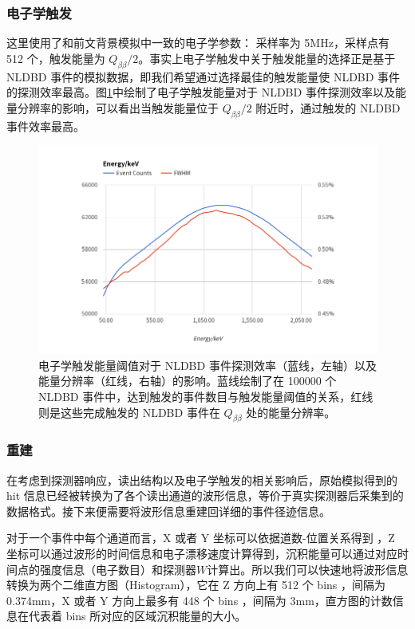 \subsubsection{电子学触发}

    这里使用了和前文背景模拟中一致的电子学参数： 采样率为 5MHz，采样点有 512 个，触发能量为 $Q_{\beta\beta}/2$。事实上电子学触发中关于触发能量的选择正是基于 NLDBD 事件的模拟数据，即我们希望通过选择最佳的触发能量使 NLDBD 事件的探测效率最高。图\ref{fig:trigger_select}中绘制了电子学触发能量对于 NLDBD 事件探测效率以及能量分辨率的影响，可以看出当触发能量位于 $Q_{\beta\beta}/2$ 附近时，通过触发的 NLDBD 事件效率最高。

    \begin{figure}
        \centering
        \includegraphics[width=0.8\columnwidth]{pic/trigger_select.png}
        \caption{电子学触发能量阈值对于 NLDBD 事件探测效率（蓝线，左轴）以及能量分辨率（红线，右轴）的影响。蓝线绘制了在 100000 个 NLDBD 事件中，达到触发的事件数目与触发能量阈值的关系，红线则是这些完成触发的 NLDBD 事件在 $Q_{\beta\beta}$ 处的能量分辨率。}
        \label{fig:trigger_select}
    \end{figure}

\subsubsection{重建}

    在考虑到探测器响应，读出结构以及电子学触发的相关影响后，原始模拟得到的 hit 信息已经被转换为了各个读出通道的波形信息，等价于真实探测器后采集到的数据格式。接下来便需要将波形信息重建回详细的事件径迹信息。

    对于一个事件中每个通道而言，X 或者 Y 坐标可以依据道数-位置关系得到 ，Z 坐标可以通过波形的时间信息和电子漂移速度计算得到，沉积能量可以通过对应时间点的强度信息（电子数目）和探测器$W$计算出。所以我们可以快速地将波形信息转换为两个二维直方图（Histogram），它在 Z 方向上有 512 个 bins ，间隔为 0.374mm，X 或者 Y 方向上最多有 448 个 bins ，间隔为 3mm，直方图的计数信息在代表着 bins 所对应的区域沉积能量的大小。

